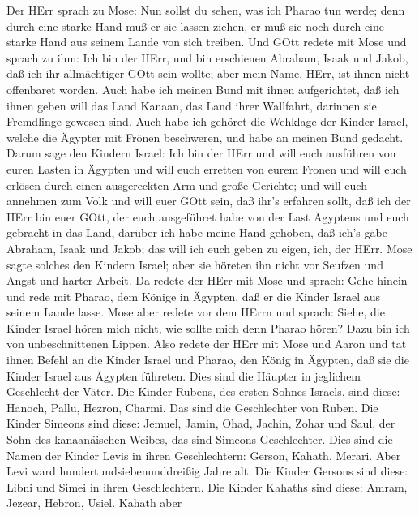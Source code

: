  Der HErr sprach zu Mose: Nun sollst du sehen, was ich
Pharao tun werde; denn durch eine starke Hand muß er sie lassen ziehen,
er muß sie noch durch eine starke Hand aus seinem Lande von sich
treiben.  Und GOtt redete mit Mose und sprach zu ihm: Ich
bin der HErr,  und bin erschienen Abraham, Isaak und Jakob,
daß ich ihr allmächtiger GOtt sein wollte; aber mein Name, HErr, ist
ihnen nicht offenbaret worden.  Auch habe ich meinen Bund
mit ihnen aufgerichtet, daß ich ihnen geben will das Land Kanaan, das
Land ihrer Wallfahrt, darinnen sie Fremdlinge gewesen sind. 
Auch habe ich gehöret die Wehklage der Kinder Israel, welche die Ägypter
mit Frönen beschweren, und habe an meinen Bund gedacht. 
Darum sage den Kindern Israel: Ich bin der HErr und will euch ausführen
von euren Lasten in Ägypten und will euch erretten von eurem Fronen und
will euch erlösen durch einen ausgereckten Arm und große Gerichte;
 und will euch annehmen zum Volk und will euer GOtt sein,
daß ihr's erfahren sollt, daß ich der HErr bin euer GOtt, der euch
ausgeführet habe von der Last Ägyptens  und euch gebracht in
das Land, darüber ich habe meine Hand gehoben, daß ich's gäbe Abraham,
Isaak und Jakob; das will ich euch geben zu eigen, ich, der HErr.
 Mose sagte solches den Kindern Israel; aber sie höreten ihn
nicht vor Seufzen und Angst und harter Arbeit.  Da redete
der HErr mit Mose und sprach:  Gehe hinein und rede mit
Pharao, dem Könige in Ägypten, daß er die Kinder Israel aus seinem Lande
lasse.  Mose aber redete vor dem HErrn und sprach: Siehe,
die Kinder Israel hören mich nicht, wie sollte mich denn Pharao hören?
Dazu bin ich von unbeschnittenen Lippen.  Also redete der
HErr mit Mose und Aaron und tat ihnen Befehl an die Kinder Israel und
Pharao, den König in Ägypten, daß sie die Kinder Israel aus Ägypten
führeten.  Dies sind die Häupter in jeglichem Geschlecht
der Väter. Die Kinder Rubens, des ersten Sohnes Israels, sind diese:
Hanoch, Pallu, Hezron, Charmi. Das sind die Geschlechter von Ruben.
 Die Kinder Simeons sind diese: Jemuel, Jamin, Ohad,
Jachin, Zohar und Saul, der Sohn des kanaanäischen Weibes, das sind
Simeons Geschlechter.  Dies sind die Namen der Kinder Levis
in ihren Geschlechtern: Gerson, Kahath, Merari. Aber Levi ward
hundertundsiebenunddreißig Jahre alt.  Die Kinder Gersons
sind diese: Libni und Simei in ihren Geschlechtern.  Die
Kinder Kahaths sind diese: Amram, Jezear, Hebron, Usiel. Kahath aber
